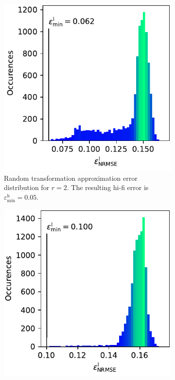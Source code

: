 \documentclass[
  a4paper,  %
  twoside,  %
  bibliography=totoc,
  headsepline,
  cleardoublepage=empty,
  parskip=half,
  draft=false
]{scrbook}
\begin{document}
\begin{mdframed}[style=style]
\vspace{2mm}
\begin{figure}[H]
  \centering
\begin{subfigure}{.5\textwidth}
  \centering
   \includegraphics[width=\linewidth]{graphics/ishigami_hist_2}
  \caption{Random transformation approximation error distribution for $r=2$. The resulting hi-fi error is $\varepsilon^\mathrm{h}_{\mathrm{min}}=0.05$.}
\vspace{3mm}
\label{fig:ishigami_hist_2}
\end{subfigure}%
\begin{subfigure}{.5\textwidth}
  \centering
   \includegraphics[width=\linewidth]{graphics/ishigami_hist_1}

\end{subfigure}
\end{figure}
\end{mdframed}
\end{document}
